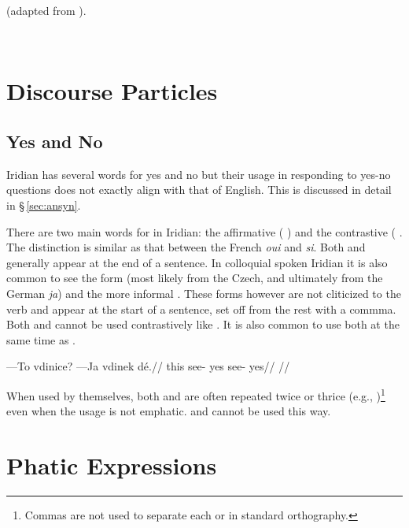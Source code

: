 \ex (adapted from \cite{jovanovic2004}).\\

  \medskip

  \\
\xe


\section{Discourse Particles}

\subsection{Yes and No}
Iridian has several words for yes and no but their usage in responding to yes-no questions does not exactly align with that of English. This is discussed in detail in \S\,\ref{sec:ansyn}.

There are two main words for  in Iridian: the affirmative  ( ) and the contrastive  ( . The distinction is similar as that between the French \emph{oui} and \emph{si}. Both  and  generally appear at the end of a sentence. In colloquial spoken Iridian it is also common to see the form  (most likely from the Czech, and ultimately from the German \emph{ja}) and the more informal . These forms however are not cliticized to the verb and appear at the start of a sentence, set off from the rest with a commma. Both  and  cannot be used contrastively like . It is also common to use both  at the same time as .

\pex
\begingl
\gla ---To vdinice? ---Ja vdinek d\'e.//
\glb this see- yes see- yes//
\glft {}//
\endgl
\xe

When used by themselves, both  and  are often repeated twice or thrice (e.g., )\footnote{Commas are not used to separate each  or  in standard orthography. } even when the usage is not emphatic.  and  cannot be used this way.

\section{Phatic Expressions}\label{sec:phatic expression}

